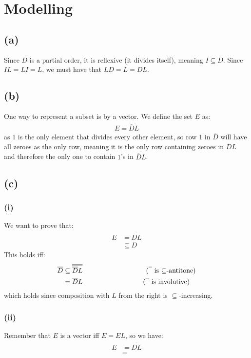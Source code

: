 \documentclass[a4paper, fleqn]{article}
\newcommand{\comment}[1]{%
  \text{\phantom{(#1)}} \tag{#1}}
\begin{document}
\section{Modelling}
\subsection{(a)}
Since $D$ is a partial order, it is reflexive (it divides itself), meaning $I\subseteq
D$. Since $IL=LI=L$, we must have that $LD=L=DL$.

\subsection{(b)}
One way to represent a subset is by a vector. We define the set $E$ as:
\begin{align*}
  E = \overline{\overline{D}L}
\end{align*}
as $1$ is the only element that divides every other element, so row $1$ in $\overline{D}$
will have all zeroes as the only row, meaning it is the only row containing zeroes in
$\overline{D}L$ and therefore the only one to contain $1$'s in $\overline{\overline{D}L}$.

\subsection{(c)}
\subsubsection{(i)}
We want to prove that:
\begin{align*}
  E &= \overline{\overline{D}L} \\
    &\subseteq D
\end{align*}
This holds iff:
\begin{align*}
  \overline{D}&\subseteq \overline{\overline{\overline{D}L}}
  \comment{$\overline{\phantom{I}}$ is
$\subseteq$-antitone} \\
&=\overline{D}L \comment{$\overline{\phantom{I}}$ is involutive}
\end{align*}
which holds since composition with $L$ from the right is $\subseteq$-increasing.

\subsubsection{(ii)}
Remember that $E$ is a vector iff $E=EL$, so we have:
\begin{align*}
  E&=\overline{\overline{D}L} \\
   &=
\end{align*}
\end{document}
